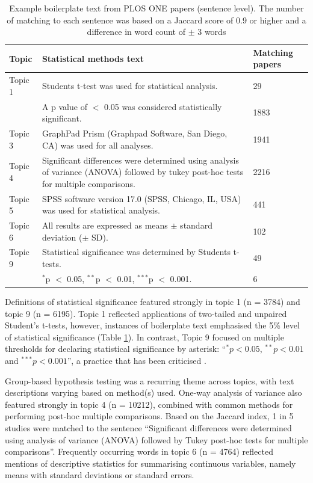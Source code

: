 \documentclass[12pt]{article}
\begin{document}
\begin{landscape}
\begin{table}

\caption{\label{tab:plos-example-boilerplate}Example boilerplate text from PLOS ONE papers (sentence level). The number of matching to each sentence was based on a Jaccard score of 0.9 or higher and a difference in word count of $\pm$ 3 words}
\centering
\begin{tabular}[t]{p{}p{}p{}}
\hline
Topic & Statistical methods text & Matching papers\\
\hline
Topic 1 & Students t-test was used for statistical analysis. & 29\\
\cline{2-3}
 & A p value of $<$ 0.05 was considered statistically significant. & 1883\\
\hline
Topic 3 & GraphPad Prism (Graphpad Software, San Diego, CA) was used for all analyses. & 1941\\
\hline
Topic 4 & Significant differences were determined using analysis of variance (ANOVA) followed by tukey post-hoc tests for multiple comparisons. & 2216\\
\hline
Topic 5 & SPSS software version 17.0 (SPSS, Chicago, IL, USA) was used for statistical analysis. & 441\\
\hline
Topic 6 & All results are expressed as means $\pm$ standard deviation ($\pm$ SD). & 102\\
\hline
Topic 9 & Statistical significance was determined by Students t-tests. & 49\\
\cline{2-3}
&  $^*$p $<$ 0.05, $^{**}$p $<$ 0.01, $^{***}$p $<$ 0.001. & 6\\
\hline
\end{tabular}
\end{table}
\end{landscape}


Definitions of statistical significance featured strongly in topic 1 (n
= 3784) and topic 9 (n = 6195). Topic 1 reflected
applications of two-tailed and unpaired Student's t-tests, however,
instances of boilerplate text emphasised the 5\% level of statistical
significance (Table \ref{tab:plos-example-boilerplate}). In contrast, Topic 9
focused on multiple thresholds for declaring statistical significance by
asterisk: ``\(^{*}p<0.05\), \(^{**}p<0.01\) and \(^{***}p<0.001\)'', a
practice that has been criticised \citep{Wasserstein2019}.

Group-based hypothesis testing was a recurring theme across topics, with
text descriptions varying based on method(s) used. One-way analysis of
variance also featured strongly in topic 4 (n = 10212), combined
with common methods for performing post-hoc multiple comparisons. Based
on the Jaccard index, 1 in 5 studies were matched to the sentence
``Significant differences were determined using analysis of variance
(ANOVA) followed by Tukey post-hoc tests for multiple comparisons''.
Frequently occurring words in topic 6 (n = 4764) reflected
mentions of descriptive statistics for summarising continuous variables,
namely means with standard deviations or standard errors.
\end{document}
